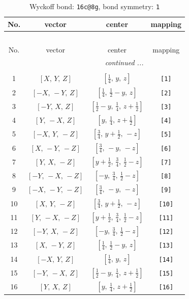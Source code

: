 \documentclass[fleqn,8pt]{jsarticle}
\begin{document}
\begin{longtable}{cccc}
\caption{Wyckoff bond: {\tt 16c@8g}, bond symmetry: {\tt 1}}
 \\
 \hline \hline
No. & vector & center & mapping \\ \hline \endfirsthead

\multicolumn{3}{l}{\tablename\ \thetable{}} \\
 \hline \hline
No. & vector & center & mapping \\ \hline \endhead

 \hline \hline
\multicolumn{3}{r}{\footnotesize\it continued ...} \\ \endfoot

 \hline \hline
\multicolumn{3}{r}{} \\ \endlastfoot

1 & $\left[ X,\, Y,\, Z \right]$ & $\left[ \frac{1}{4},\, y,\, z \right]$ & {\tt [1]} \\ \hline
2 & $\left[ - X,\, - Y,\, Z \right]$ & $\left[ \frac{1}{4},\, \frac{1}{2} - y,\, z \right]$ & {\tt [2]} \\ \hline
3 & $\left[ - Y,\, X,\, Z \right]$ & $\left[ \frac{1}{2} - y,\, \frac{1}{4},\, z + \frac{1}{2} \right]$ & {\tt [3]} \\ \hline
4 & $\left[ Y,\, - X,\, Z \right]$ & $\left[ y,\, \frac{1}{4},\, z + \frac{1}{2} \right]$ & {\tt [4]} \\ \hline
5 & $\left[ - X,\, Y,\, - Z \right]$ & $\left[ \frac{3}{4},\, y + \frac{1}{2},\, - z \right]$ & {\tt [5]} \\ \hline
6 & $\left[ X,\, - Y,\, - Z \right]$ & $\left[ \frac{3}{4},\, - y,\, - z \right]$ & {\tt [6]} \\ \hline
7 & $\left[ Y,\, X,\, - Z \right]$ & $\left[ y + \frac{1}{2},\, \frac{3}{4},\, \frac{1}{2} - z \right]$ & {\tt [7]} \\ \hline
8 & $\left[ - Y,\, - X,\, - Z \right]$ & $\left[ - y,\, \frac{3}{4},\, \frac{1}{2} - z \right]$ & {\tt [8]} \\ \hline
9 & $\left[ - X,\, - Y,\, - Z \right]$ & $\left[ \frac{3}{4},\, - y,\, - z \right]$ & {\tt [9]} \\ \hline
10 & $\left[ X,\, Y,\, - Z \right]$ & $\left[ \frac{3}{4},\, y + \frac{1}{2},\, - z \right]$ & {\tt [10]} \\ \hline
11 & $\left[ Y,\, - X,\, - Z \right]$ & $\left[ y + \frac{1}{2},\, \frac{3}{4},\, \frac{1}{2} - z \right]$ & {\tt [11]} \\ \hline
12 & $\left[ - Y,\, X,\, - Z \right]$ & $\left[ - y,\, \frac{3}{4},\, \frac{1}{2} - z \right]$ & {\tt [12]} \\ \hline
13 & $\left[ X,\, - Y,\, Z \right]$ & $\left[ \frac{1}{4},\, \frac{1}{2} - y,\, z \right]$ & {\tt [13]} \\ \hline
14 & $\left[ - X,\, Y,\, Z \right]$ & $\left[ \frac{1}{4},\, y,\, z \right]$ & {\tt [14]} \\ \hline
15 & $\left[ - Y,\, - X,\, Z \right]$ & $\left[ \frac{1}{2} - y,\, \frac{1}{4},\, z + \frac{1}{2} \right]$ & {\tt [15]} \\ \hline
16 & $\left[ Y,\, X,\, Z \right]$ & $\left[ y,\, \frac{1}{4},\, z + \frac{1}{2} \right]$ & {\tt [16]} \\
\end{longtable}
\end{document}
